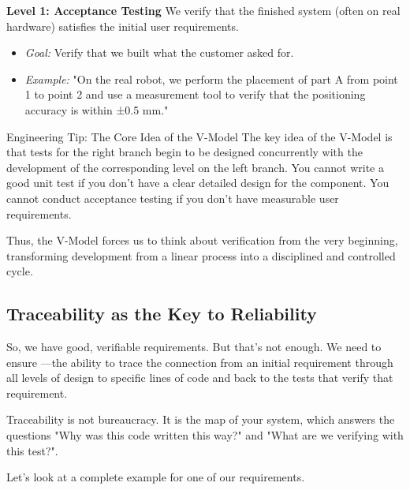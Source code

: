 \textbf{Level 1: Acceptance Testing}
We verify that the finished system (often on real hardware) satisfies the initial user requirements.
\begin{itemize}
    \item \textit{Goal:} Verify that we built what the customer asked for.
    \item \textit{Example:} "On the real robot, we perform the placement of part A from point 1 to point 2 and use a measurement tool to verify that the positioning accuracy is within ±0.5 mm."
\end{itemize}

\begin{tipbox}{Engineering Tip: The Core Idea of the V-Model}
The key idea of the V-Model is that tests for the right branch begin to be designed concurrently with the development of the corresponding level on the left branch. You cannot write a good unit test if you don't have a clear detailed design for the component. You cannot conduct acceptance testing if you don't have measurable user requirements.
\end{tipbox}

Thus, the V-Model forces us to think about verification from the very beginning, transforming development from a linear process into a disciplined and controlled cycle.

\subsection{Traceability as the Key to Reliability}

So, we have good, verifiable requirements. But that's not enough. We need to ensure —the ability to trace the connection from an initial requirement through all levels of design to specific lines of code and back to the tests that verify that requirement.

Traceability is not bureaucracy. It is the map of your system, which answers the questions "Why was this code written this way?" and "What are we verifying with this test?".

Let's look at a complete example for one of our requirements.

